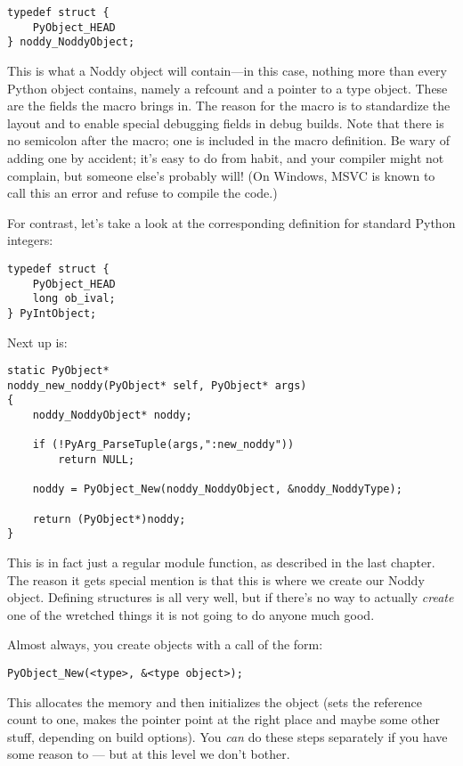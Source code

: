 \begin{verbatim}
typedef struct {
    PyObject_HEAD
} noddy_NoddyObject;
\end{verbatim}

This is what a Noddy object will contain---in this case, nothing more
than every Python object contains, namely a refcount and a pointer to a type
object.  These are the fields the  macro brings
in.  The reason for the macro is to standardize the layout and to
enable special debugging fields in debug builds.  Note that there is
no semicolon after the  macro; one is included in
the macro definition.  Be wary of adding one by accident; it's easy to
do from habit, and your compiler might not complain, but someone
else's probably will!  (On Windows, MSVC is known to call this an
error and refuse to compile the code.)

For contrast, let's take a look at the corresponding definition for
standard Python integers:

\begin{verbatim}
typedef struct {
    PyObject_HEAD
    long ob_ival;
} PyIntObject;
\end{verbatim}

Next up is:

\begin{verbatim}
static PyObject*
noddy_new_noddy(PyObject* self, PyObject* args)
{
    noddy_NoddyObject* noddy;

    if (!PyArg_ParseTuple(args,":new_noddy")) 
        return NULL;

    noddy = PyObject_New(noddy_NoddyObject, &noddy_NoddyType);

    return (PyObject*)noddy;
}
\end{verbatim}

This is in fact just a regular module function, as described in the
last chapter.  The reason it gets special mention is that this is
where we create our Noddy object.  Defining 
structures is all very well, but if there's no way to actually
\emph{create} one of the wretched things it is not going to do anyone
much good.

Almost always, you create objects with a call of the form:

\begin{verbatim}
PyObject_New(<type>, &<type object>);
\end{verbatim}

This allocates the memory and then initializes the object (sets
the reference count to one, makes the  pointer point at
the right place and maybe some other stuff, depending on build options).
You \emph{can} do these steps separately if you have some reason to
--- but at this level we don't bother.

